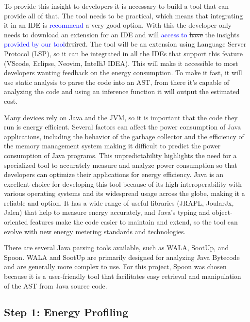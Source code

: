\documentclass[sigplan]{acmart}
\newcommand{\wnote}[1]{\textcolor{blue}{#1}}
\begin{document}
To provide this insight to developers it is necessary to build a tool that can provide all of that. The tool needs to be practical, which means that integrating it in an IDE is \wnote{recommend} \st{a very good option}. With this the developer only needs to download an extension for an IDE and will \wnote{access to} \st{have} the insights \wnote{provided by our tool}\st{desired}.
The tool will be an extension using Language Server Protocol (LSP), so it can be integrated in all the IDEs that support this feature (VScode, Eclipse, Neovim, IntelliJ IDEA). This will make it accessible to most developers wanting feedback on the energy consumption. To make it fast, it will use static analysis to parse the code into an AST, from there it's capable of analyzing the code and using an inference function it will output the estimated cost.

Many devices rely on Java and the JVM, so it is important that the code they run is energy efficient. Several factors can affect the power consumption of Java applications, including the behavior of the garbage collector and the efficiency of the memory management system \cite{10.5555/1267847.1267870} making it difficult to predict the power consumption of Java programs. This unpredictability highlights the need for a specialized tool to accurately measure and analyze power consumption so that developers can optimize their applications for energy efficiency.
Java is an excellent choice for developing this tool because of its high interoperability with various operating systems and its widespread usage across the globe, making it a reliable and option. It has a wide range of useful libraries (JRAPL, JoularJx, Jalen) that help to measure energy accurately, and Java's typing and object-oriented features make the code easier to maintain and extend, so the tool can evolve with new energy metering standards and technologies. 

There are several Java parsing tools available, such as WALA\cite{wala_main}, SootUp\cite{sootup_main}, and Spoon\cite{spoon_main}. WALA and SootUp are primarily designed for analyzing Java Bytecode and are generally more complex to use. For this project, Spoon was chosen because it is a user-friendly tool that facilitates easy retrieval and manipulation of the AST from Java source code.

\subsection{Step 1: Energy Profiling} \label{sec:work_step1_energy_profiling}
\end{document}
